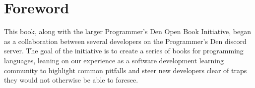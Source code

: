\documentclass[../main.tex]{subfiles}
\begin{document}
\chapter{Foreword}
This book, along with the larger Programmer's Den Open Book Initiative,
began as a collaboration between several developers on the Programmer's Den
discord server. The goal of the initiative is to create a series of books for
programming languages, leaning on our experience as a software development
learning community to highlight common pitfalls and steer new developers
clear of traps they would not otherwise be able to foresee.

\end{document}
